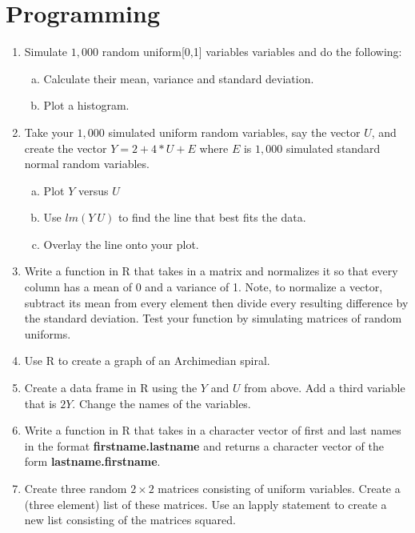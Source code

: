 \documentclass[12pt]{article}
\begin{document}
\section{Programming}
\begin{enumerate}[1.]
\item Simulate $1,000$ random uniform[0,1] variables
  variables and do the following:
  \begin{enumerate}[a.]
  \item Calculate their mean, variance and standard deviation.
  \item Plot a histogram.
  \end{enumerate}
\item Take your $1,000$ simulated uniform random variables, say the
  vector $U$, and create the vector $Y = 2 + 4 * U + E$ where $E$ is
  $1,000$ simulated standard normal random variables.
  \begin{enumerate}[a.]
  \item Plot $Y$ versus $U$
  \item Use $lm(Y ~ U)$ to find the line that best fits the data.
  \item Overlay the line onto your plot.
  \end{enumerate}
\item Write a function in R that takes in a matrix and normalizes it so that
  every column has a mean of 0 and a variance of 1. Note, to normalize
  a vector, subtract its mean from every element then divide every resulting difference
  by the standard deviation. Test your function by simulating matrices of random uniforms.
\item Use R to create a graph of an Archimedian spiral.
\item Create a data frame in R using the $Y$ and $U$ from above. Add a third variable
  that is $2Y$. Change the names of the variables. 
\item Write a function in R that takes in a character vector of first and last names
  in the format {\bf firstname.lastname} and returns a character vector of the form
{\bf lastname.firstname}.
\item Create three random $2\times 2$ matrices consisting of uniform variables. 
  Create a (three element) list of these matrices. Use an lapply statement to create
  a new list consisting of the matrices squared.
\end{enumerate}
\end{document}
